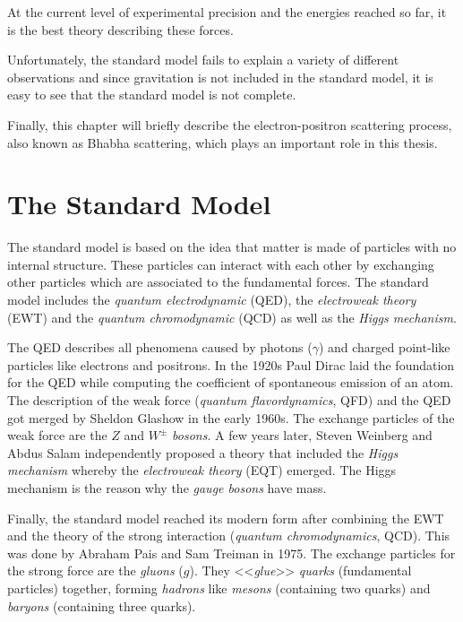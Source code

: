 \documentclass[a4paper,11pt,twosided,final,german,openbib,pdftex,listof=totoc,bibliography=totoc]{scrbook}
\begin{document}
 At the current level of experimental precision and the energies reached so far, it is the best theory describing these forces.
 
 Unfortunately, the standard model fails to explain a variety of different observations and since gravitation is not included in the standard model, it is easy to see that the standard model is not complete.
 
 
 Finally, this chapter will briefly describe the electron-positron scattering process, also known as Bhabha scattering, which plays an important role in this thesis.
 
 
\section{The Standard Model}
\label{sec:SM}

The standard model is based on the idea that matter is made of particles with no internal structure. These particles can interact with each other by exchanging other particles which are associated to the fundamental forces. The standard model includes the \textit{quantum electrodynamic} (QED), the \textit{electroweak theory} (EWT) and the \textit{quantum chromodynamic} (QCD) as well as the \textit{Higgs mechanism}.
\newline

The QED describes all phenomena caused by photons ($\gamma$) and charged point-like particles like electrons and positrons. In the 1920s Paul Dirac laid the foundation for the QED while computing the coefficient of spontaneous emission of an atom. The description of the weak force (\textit{quantum flavordynamics}, QFD) and the QED got merged by Sheldon Glashow in the early 1960s. The exchange particles of the weak force are the $Z$ and $W^{\pm}$ \textit{bosons}. A few years later, Steven Weinberg and Abdus Salam independently proposed a theory that included the \textit{Higgs mechanism} whereby the \textit{electroweak theory} (EQT) emerged. The Higgs mechanism is the reason why the \textit{gauge bosons} have mass.

Finally, the standard model reached its modern form after combining the EWT and the theory of the strong interaction (\textit{quantum chromodynamics}, QCD). This was done by Abraham Pais and Sam Treiman in 1975. The exchange particles for the strong force are the \textit{gluons} ($g$). They <<\textit{glue}>> \textit{quarks} (fundamental particles) together, forming \textit{hadrons} like \textit{mesons} (containing two quarks) and \textit{baryons} (containing three quarks). \cite{RiseStandard}
\end{document}
